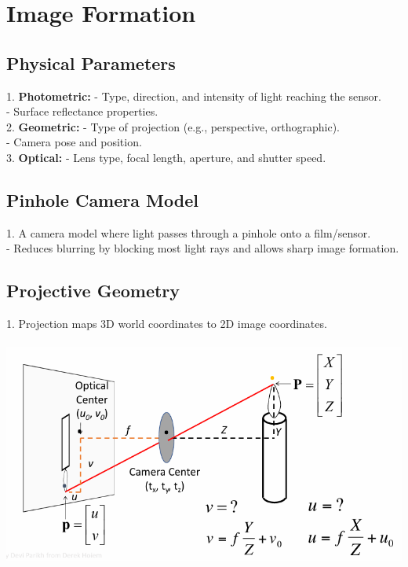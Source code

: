 \section{Image Formation}

\subsection*{Physical Parameters}
1. \textbf{Photometric:} 
   - Type, direction, and intensity of light reaching the sensor. \\
   - Surface reflectance properties. \\
2. \textbf{Geometric:} 
   - Type of projection (e.g., perspective, orthographic). \\
   - Camera pose and position. \\
3. \textbf{Optical:}
   - Lens type, focal length, aperture, and shutter speed. \\

\subsection*{Pinhole Camera Model}
1. A camera model where light passes through a pinhole onto a film/sensor. \\
- Reduces blurring by blocking most light rays and allows sharp image formation. \\

\subsection*{Projective Geometry}
1. Projection maps 3D world coordinates to 2D image coordinates. \\
\
\includegraphics[width=1\linewidth]{images/l10-pinhole.png}

